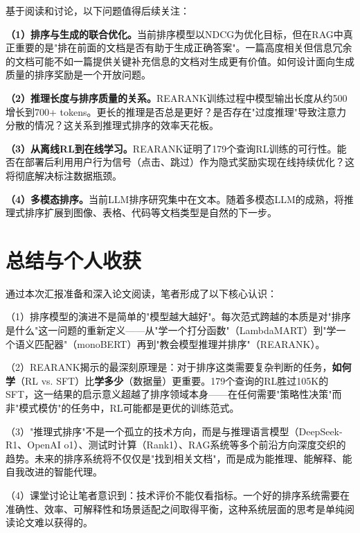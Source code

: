 \documentclass[12pt,a4paper]{article}
\begin{document}
基于阅读和讨论，以下问题值得后续关注：

\textbf{（1）排序与生成的联合优化。}当前排序模型以NDCG为优化目标，但在RAG中真正重要的是"排在前面的文档是否有助于生成正确答案"。一篇高度相关但信息冗余的文档可能不如一篇提供关键补充信息的文档对生成更有价值。如何设计面向生成质量的排序奖励是一个开放问题。

\textbf{（2）推理长度与排序质量的关系。}REARANK训练过程中模型输出长度从约500增长到700+ tokens。更长的推理是否总是更好？是否存在"过度推理"导致注意力分散的情况？这关系到推理式排序的效率天花板。

\textbf{（3）从离线RL到在线学习。}REARANK证明了179个查询RL训练的可行性。能否在部署后利用用户行为信号（点击、跳过）作为隐式奖励实现在线持续优化？这将彻底解决标注数据瓶颈。

\textbf{（4）多模态排序。}当前LLM排序研究集中在文本。随着多模态LLM的成熟，将推理式排序扩展到图像、表格、代码等文档类型是自然的下一步。

\section{总结与个人收获}

通过本次汇报准备和深入论文阅读，笔者形成了以下核心认识：

（1）排序模型的演进不是简单的"模型越大越好"。每次范式跨越的本质是对"排序是什么"这一问题的重新定义——从"学一个打分函数"（LambdaMART）到"学一个语义匹配器"（monoBERT）再到"教会模型推理并排序"（REARANK）。

（2）REARANK揭示的最深刻原理是：对于排序这类需要复杂判断的任务，\textbf{如何学}（RL vs. SFT）比\textbf{学多少}（数据量）更重要。179个查询的RL胜过105K的SFT，这一结果的启示意义超越了排序领域本身——在任何需要"策略性决策"而非"模式模仿"的任务中，RL可能都是更优的训练范式。

（3）"推理式排序"不是一个孤立的技术方向，而是与推理语言模型（DeepSeek-R1、OpenAI o1）、测试时计算（Rank1）、RAG系统等多个前沿方向深度交织的趋势。未来的排序系统将不仅仅是"找到相关文档"，而是成为能推理、能解释、能自我改进的智能代理。

（4）课堂讨论让笔者意识到：技术评价不能仅看指标。一个好的排序系统需要在准确性、效率、可解释性和场景适配之间取得平衡，这种系统层面的思考是单纯阅读论文难以获得的。
\end{document}
